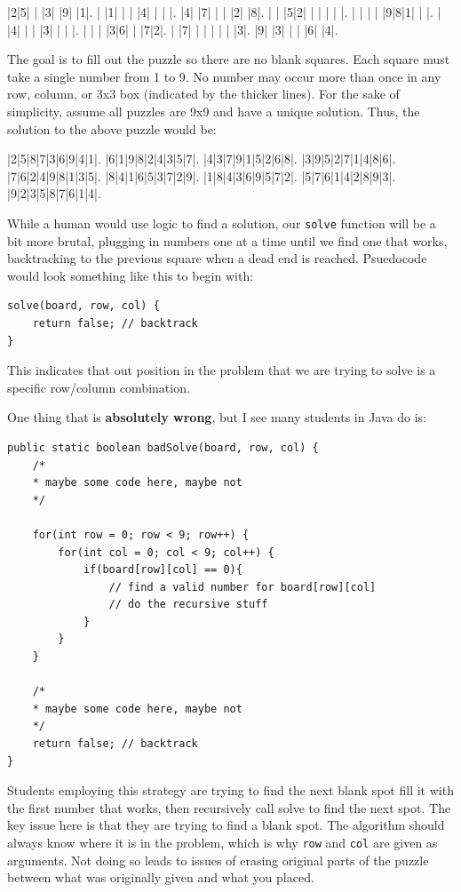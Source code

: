 \begin{sudoku}
	|2|5| | |3| |9| |1|.
	| |1| | | |4| | | |.
	|4| |7| | | |2| |8|.
	| | |5|2| | | | | |.
	| | | | |9|8|1| | |.
	| |4| | | |3| | | |.
	| | | |3|6| | |7|2|.
	| |7| | | | | | |3|.
	|9| |3| | | |6| |4|.
\end{sudoku}

The goal is to fill out the puzzle so there are no blank squares.  
Each square must take a single number from 1 to 9.
No number may occur more than once in any row, column, or 3x3 box (indicated by the thicker lines).
For the sake of simplicity, assume all puzzles are 9x9 and have a unique solution.
Thus, the solution to the above puzzle would be: 
\begin{sudoku}
|2|5|8|7|3|6|9|4|1|.
|6|1|9|8|2|4|3|5|7|.
|4|3|7|9|1|5|2|6|8|.
|3|9|5|2|7|1|4|8|6|.
|7|6|2|4|9|8|1|3|5|.
|8|4|1|6|5|3|7|2|9|.
|1|8|4|3|6|9|5|7|2|.
|5|7|6|1|4|2|8|9|3|.
|9|2|3|5|8|7|6|1|4|.
\end{sudoku}

While a human would use logic to find a solution, our \texttt{solve} function will be a bit more brutal, plugging in numbers one at a time until we find one that works, backtracking to the previous square when a dead end is reached.  Psuedocode would look something like this to begin with:

\begin{verbatim}
solve(board, row, col) {
	return false; // backtrack
}
\end{verbatim}

This indicates that out position in the problem that we are trying to solve is a specific row/column combination.

One thing that is \textbf{absolutely wrong}, but I see many students in Java do is:
\begin{verbatim}
public static boolean badSolve(board, row, col) {
	/*
	* maybe some code here, maybe not
	*/
	
	for(int row = 0; row < 9; row++) {
		for(int col = 0; col < 9; col++) {
			if(board[row][col] == 0){
				// find a valid number for board[row][col]	
				// do the recursive stuff	
			}
		}
	}
	
	/*
	* maybe some code here, maybe not
	*/
	return false; // backtrack
}
\end{verbatim}

Students employing this strategy are trying to find the next blank spot fill it with the first number that works, then recursively call solve to find the next spot. The key issue here is that they are trying to find a blank spot. The algorithm should always know where it is in the problem, which is why \texttt{row} and \texttt{col} are given as arguments. Not doing so leads to issues of erasing original parts of the puzzle  between what was originally given and what you placed.


